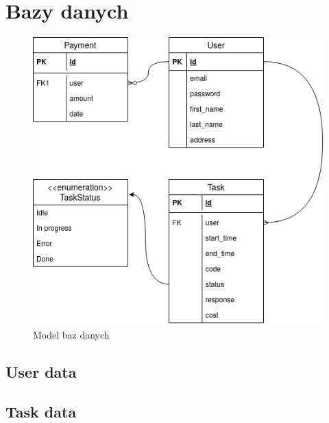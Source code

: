 \section{Bazy danych}
\begin{figure}[!ht]
    \centering
    \includegraphics[width=\textwidth]{images/RSO_model.png}
    \caption{Model baz danych}
    \label{fig:db_model}
\end{figure}
\subsection{User data}
\lipsum[1]
\subsection{Task data}
\lipsum[1]

